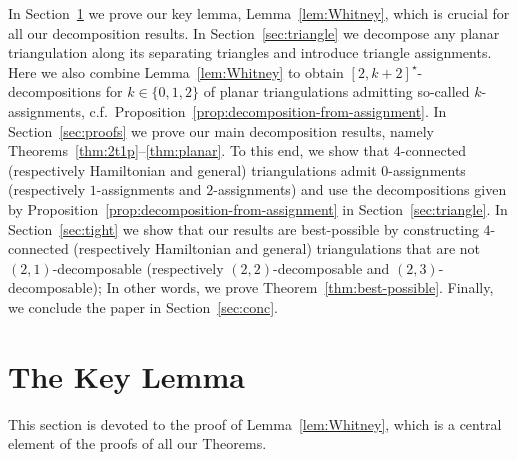 \documentclass[a4paper,10pt]{article}
\theoremstyle{plain}
\begin{document}
In Section~\ref{sec:Whitney-lemma} we prove our key lemma, Lemma~\ref{lem:Whitney}, which is crucial for all our decomposition results. 
In Section~\ref{sec:triangle} we decompose any planar triangulation along its separating triangles and introduce triangle assignments.
Here we also combine Lemma~\ref{lem:Whitney} to obtain $[2,k+2]^\star$-decompositions for $k \in \{0,1,2\}$ of planar triangulations admitting so-called $k$-assignments, c.f.\ Proposition~\ref{prop:decomposition-from-assignment}.
In Section~\ref{sec:proofs} we prove our main decomposition results, namely Theorems~\ref{thm:2t1p}--\ref{thm:planar}.
To this end, we show that $4$-connected (respectively Hamiltonian and general) triangulations admit $0$-assignments (respectively $1$-assignments and $2$-assignments) and use the decompositions given by Proposition~\ref{prop:decomposition-from-assignment} in Section~\ref{sec:triangle}.
In Section~\ref{sec:tight} we show that our results are best-possible by constructing $4$-connected (respectively Hamiltonian and general) triangulations that are not $(2,1)$-decomposable (respectively $(2,2)$-decomposable and $(2,3)$-decomposable); In other words, we prove Theorem~\ref{thm:best-possible}.
Finally, we conclude the paper in Section~\ref{sec:conc}.





















\section{The Key Lemma}\label{sec:Whitney-lemma}

This section is devoted to the proof of Lemma~\ref{lem:Whitney}, which is a central element of the proofs of all our Theorems.
\end{document}
